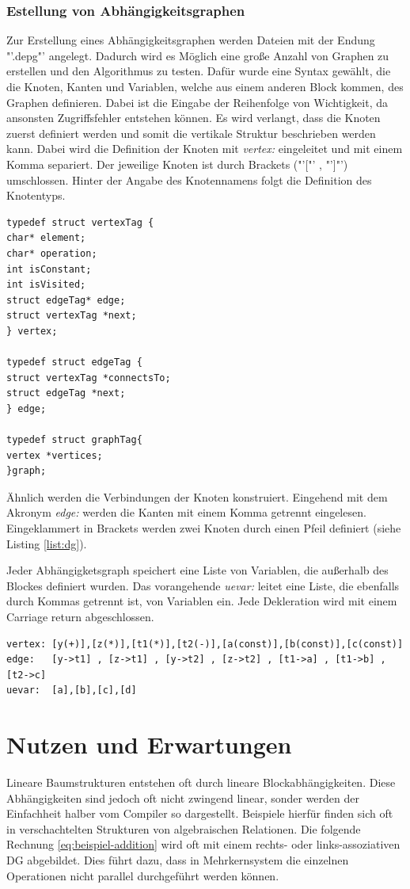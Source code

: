 \subsubsection*{Estellung von Abhängigkeitsgraphen}
Zur Erstellung eines Abhängigkeitsgraphen werden Dateien mit der Endung "'.depg"' angelegt. Dadurch wird es Möglich eine große Anzahl von Graphen zu erstellen und den Algorithmus zu testen. Dafür wurde eine Syntax gewählt, die die Knoten, Kanten und Variablen, welche aus einem anderen Block kommen, des Graphen definieren. Dabei ist die Eingabe der Reihenfolge von Wichtigkeit, da ansonsten Zugriffsfehler entstehen können. 
Es wird verlangt, dass die Knoten zuerst definiert werden und somit die vertikale Struktur beschrieben werden kann. Dabei wird die Definition der Knoten mit \textit{vertex:} eingeleitet und mit einem Komma separiert.
Der jeweilige Knoten ist durch Brackets ("'["' , "']"') umschlossen. Hinter der Angabe des Knotennamens folgt die Definition des Knotentyps. 
\newpage
\begin{lstlisting}[caption=Struktur eines Graphen., label=list:graph]
typedef struct vertexTag {
char* element;    
char* operation;  
int isConstant;
int isVisited;
struct edgeTag* edge;
struct vertexTag *next;
} vertex;

typedef struct edgeTag {
struct vertexTag *connectsTo;
struct edgeTag *next;
} edge;

typedef struct graphTag{
vertex *vertices;
}graph;
\end{lstlisting}

Ähnlich werden die Verbindungen der Knoten konstruiert. Eingehend mit dem Akronym \textit{edge:} werden die Kanten mit einem Komma getrennt eingelesen. Eingeklammert in Brackets werden zwei Knoten durch einen Pfeil definiert (siehe Listing \ref{list:dg}). 

Jeder Abhängigketsgraph speichert eine Liste von Variablen, die außerhalb des Blockes definiert wurden. Das 
vorangehende \textit{uevar:} leitet eine Liste, die ebenfalls durch Kommas getrennt ist, von Variablen ein. Jede Dekleration wird mit einem Carriage return abgeschlossen.
\begin{lstlisting}[caption=Konstruktion eines Abhängigkeitsgraphen., label=list:dg]
vertex: [y(+)],[z(*)],[t1(*)],[t2(-)],[a(const)],[b(const)],[c(const)]
edge:   [y->t1] , [z->t1] , [y->t2] , [z->t2] , [t1->a] , [t1->b] ,[t2->c] 
uevar:  [a],[b],[c],[d]
\end{lstlisting}


\section{Nutzen und Erwartungen}
\label{Nutzen}
Lineare Baumstrukturen entstehen oft durch lineare Blockabhängigkeiten. Diese Abhängigkeiten sind jedoch oft nicht zwingend linear, sonder werden der Einfachheit halber vom Compiler so dargestellt. Beispiele hierfür finden sich oft in verschachtelten Strukturen von algebraischen Relationen.
Die folgende Rechnung \ref{eq:beispiel-addition} wird oft mit einem rechts- oder links-assoziativen DG abgebildet. Dies führt dazu, dass in Mehrkernsystem die einzelnen Operationen nicht parallel durchgeführt werden können.

